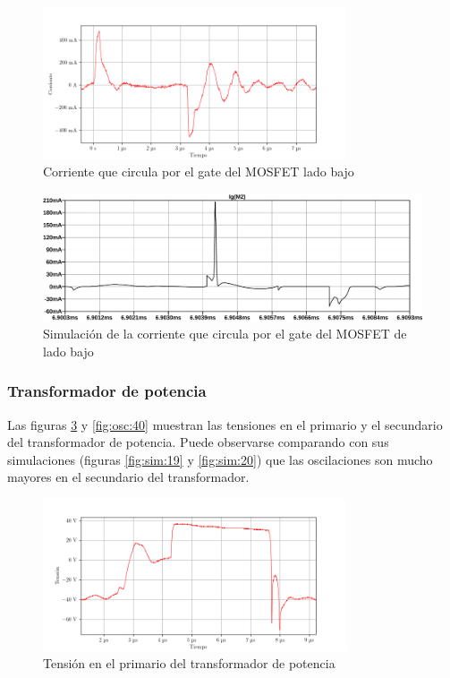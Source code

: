 \begin{figure}[H]
    \centering
    \includegraphics[width=0.8\textwidth]{images/capturas-osciloscopio/17-11-2022/17.png}
    \caption{Corriente que circula por el gate del MOSFET lado bajo}
    \label{fig:osc:17}
\end{figure}

\begin{figure}[H]
    \centering
    \includegraphics[width=\textwidth]{images/sim/9.pdf}
    \caption{Simulación de la corriente que circula por el gate del MOSFET de lado bajo}
    \label{fig:sim:9}
\end{figure}

\subsubsection{Transformador de potencia}

Las figuras \ref{fig:osc:38} y \ref{fig:osc:40} muestran las tensiones en el primario y el secundario del transformador de potencia. Puede observarse comparando con sus simulaciones (figuras \ref{fig:sim:19} y \ref{fig:sim:20}) que las oscilaciones son mucho mayores en el secundario del transformador.

\begin{figure}[H]
    \centering
    \includegraphics[width=0.8\textwidth]{images/capturas-osciloscopio/17-11-2022/55.png}
    \caption{Tensión en el primario del transformador de potencia}
    \label{fig:osc:38}
\end{figure}

